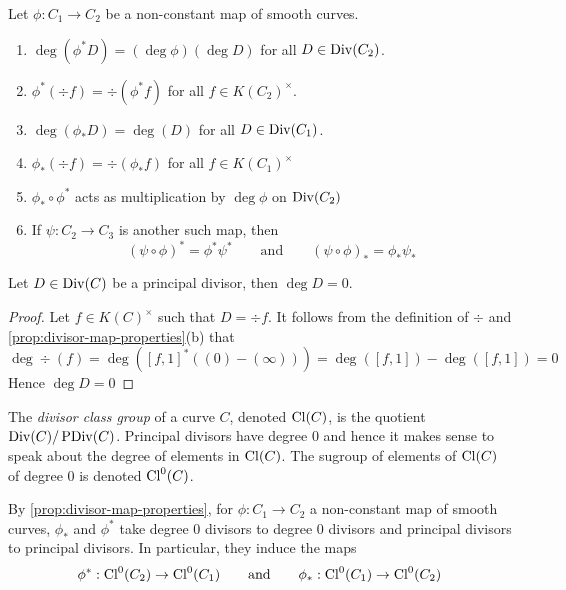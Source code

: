 \begin{proposition}
	\label{prop:divisor-map-properties}
	Let $\phi: C_1 \to C_2$ be a non-constant map of smooth curves.
	\begin{enumerate}[label=(\alph*), itemsep=0em]
		\item $\deg(\phi^*D) = (\deg\phi)(\deg D)$ for all $D \in \operatorname{Div}(C_2)$.
		\item $\phi^*(\div f) = \div(\phi^* f)$ for all $f \in K(C_2)^\times$.
		\item $\deg(\phi_*D) = \deg(D)$ for all $D \in \operatorname{Div}(C_1)$.
		\item $\phi_*(\div f) = \div(\phi_* f)$ for all $f\in K(C_1)^\times$
		\item $\phi_*\circ \phi^*$ acts as multiplication by $\deg \phi$
			on $\operatorname{Div}(C_2)$
		\item If $\psi: C_2\to C_3$ is another such map,
			then
			\begin{equation*}
				(\psi\circ\phi)^* = \phi^*\psi^*
				\qquad\textrm{and}\qquad
				(\psi\circ\phi)_* = \phi_*\psi_*
			\end{equation*}
	\end{enumerate}
\end{proposition}

\begin{proposition}
	Let $D \in \operatorname{Div}(C)$ be a principal divisor, then $\deg D = 0$.
\end{proposition}

\begin{proof}
	Let $f \in K(C)^\times$ such that $D = \div f$. It follows from the
	definition of $\div$ and \ref{prop:divisor-map-properties}(b) that
	\begin{equation*}
		\deg \div(f) = \deg([f, 1]^*((0) - (\infty)))
		= \deg([f, 1]) - \deg([f, 1]) = 0
	\end{equation*}
	Hence $\deg D = 0$
\end{proof}

\begin{definition}
	The \emph{divisor class group} of a curve $C$,
	denoted $\operatorname{Cl}(C)$, is the quotient $\operatorname{Div}(C)/\operatorname{PDiv}(C)$.
	Principal divisors have degree $0$ and hence it makes sense to speak about
	the degree of elements in $\operatorname{Cl}(C)$. The sugroup of elements of $\operatorname{Cl}(C)$ of
	degree $0$ is denoted $\operatorname{Cl}^0(C)$.
\end{definition}

\begin{remark}
	By \ref{prop:divisor-map-properties}, for $\phi: C_1\to C_2$ a non-constant
	map of smooth curves, $\phi_*$ and $\phi^*$ take degree 0 divisors to degree
	0 divisors and principal divisors to principal divisors.
	In particular, they induce the maps
	\begin{equation*}
		\phi^*: \operatorname{Cl}^0(C_2) \to \operatorname{Cl}^0(C_1)
		\qquad\textrm{and}\qquad
		\phi_*: \operatorname{Cl}^0(C_1) \to \operatorname{Cl}^0(C_2)
	\end{equation*}
\end{remark}

